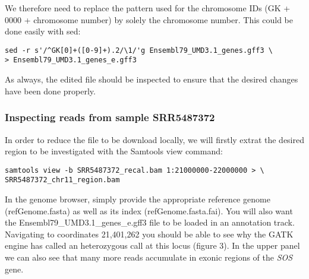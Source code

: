We therefore need to replace the pattern used for the chromosome IDs (GK + 0000 + chromosome number) by solely the chromosome number. This could be done easily with sed:

\begin{verbatim}
sed -r s'/^GK[0]+([0-9]+).2/\1/'g Ensembl79_UMD3.1_genes.gff3 \
> Ensembl79_UMD3.1_genes_e.gff3
\end{verbatim}

As always, the edited file should be inspected to ensure that the desired changes have been done properly.


\subsubsection{Inspecting reads from sample SRR5487372}



In order to reduce the file to be download locally, we will firstly extrat the desired region to be investigated with the Samtools view command:

\begin{verbatim}
samtools view -b SRR5487372_recal.bam 1:21000000-22000000 > \
SRR5487372_chr11_region.bam
\end{verbatim}


In the genome browser, simply provide the appropriate reference genome (refGenome.fasta) as well as its index (refGenome.fasta.fai). You will also want the Ensembl79_UMD3.1_genes_e.gff3 file to be loaded in an annotation track. Navigating to coordinates 21,401,262 you should be able to see why the GATK engine has called an heterozygous call at this locus (figure 3). In the upper panel we can also see that many more reads accumulate in exonic regions of the \textit{SOS} gene.







